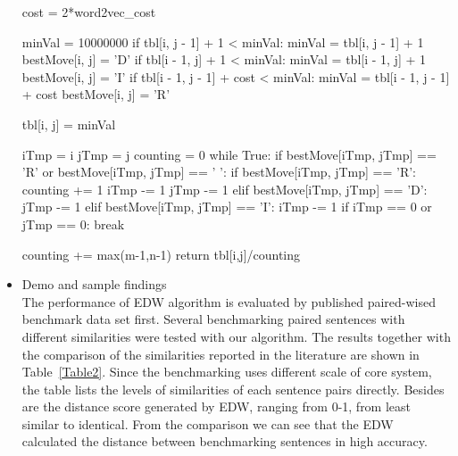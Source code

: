 \documentclass[10pt]{article}
\begin{document}
\begin{itemize}
\begin{python}
                cost = 2*word2vec_cost

                minVal = 10000000
                if tbl[i, j - 1] + 1 < minVal:
                    minVal = tbl[i, j - 1] + 1
                    bestMove[i, j] = 'D'
                if tbl[i - 1, j] + 1 < minVal:
                    minVal = tbl[i - 1, j] + 1
                    bestMove[i, j] = 'I'
                if tbl[i - 1, j - 1] + cost < minVal:
                    minVal = tbl[i - 1, j - 1] + cost
                    bestMove[i, j] = 'R'

                tbl[i, j] = minVal

    iTmp = i
    jTmp = j
    counting = 0
    while True:
        if bestMove[iTmp, jTmp] == 'R' or bestMove[iTmp, jTmp] == ' ':
            if bestMove[iTmp, jTmp] == 'R':
            counting += 1
            iTmp -= 1
           jTmp -= 1
        elif bestMove[iTmp, jTmp] == 'D':
            jTmp -= 1
        elif bestMove[iTmp, jTmp] == 'I':
            iTmp -= 1
        if iTmp == 0 or jTmp == 0:
            break

    counting += max(m-1,n-1)
    return tbl[i,j]/counting

\end{python}


\item{}
Demo and sample findings\\
The performance of EDW algorithm is evaluated by published paired-wised benchmark data set \cite{O'shea:2014:NBD:2560566.2537046}  first. Several benchmarking paired sentences with different similarities were tested with our algorithm. The results together with the comparison of the similarities reported in the literature are shown in Table~\ref{Table2}. Since the benchmarking uses different scale of core system, the table lists the levels of similarities of each sentence pairs directly. Besides are the distance score generated by EDW, ranging from 0-1, from least similar to identical. From the comparison we can see that the EDW calculated the distance between benchmarking sentences in high accuracy. \\\\


\end{itemize}
\end{document}
